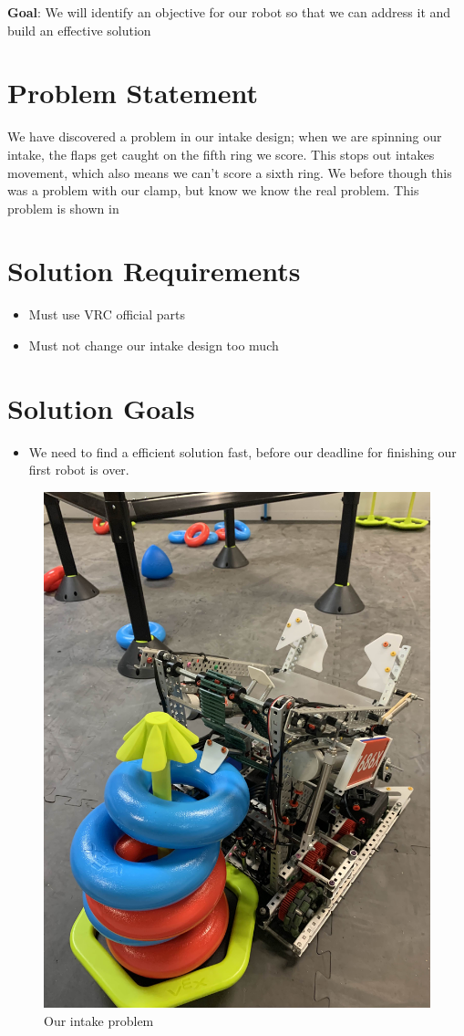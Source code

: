 \textbf{Goal}: We will identify an objective for our robot so that we can address it and build an effective solution
\section*{Problem Statement}
We have discovered a problem in our intake design; when we are spinning our intake, the flaps get caught on the fifth ring we score. This stops out intakes movement, which also means we can't score a sixth ring. We before though this was a problem with our clamp, but know we know the real problem. This problem is shown in  
\section*{Solution Requirements}
\begin{itemize}
    \item Must use VRC official parts
    \item Must not change our intake design too much
\end{itemize}
\section*{Solution Goals}
\begin{itemize}
    \item We need to find a efficient solution fast, before our deadline for finishing our first robot is over.
\end{itemize}
\begin{figure}[h!]
    \centering
    \includegraphics[width=0.5\linewidth]{images/Intake-problem.jpg}
    \caption{Our intake problem}
    \label{intake-problem}
\end{figure}
